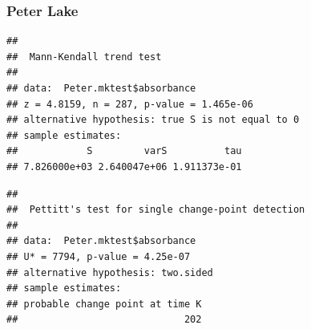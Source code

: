 \documentclass[12pt,]{article}
\newenvironment{Shaded}{\begin{snugshade}}{\end{snugshade}}
\newcommand{\KeywordTok}[1]{\textcolor[rgb]{0.13,0.29,0.53}{\textbf{#1}}}
\newcommand{\DecValTok}[1]{\textcolor[rgb]{0.00,0.00,0.81}{#1}}
\newcommand{\StringTok}[1]{\textcolor[rgb]{0.31,0.60,0.02}{#1}}
\newcommand{\CommentTok}[1]{\textcolor[rgb]{0.56,0.35,0.01}{\textit{#1}}}
\newcommand{\OperatorTok}[1]{\textcolor[rgb]{0.81,0.36,0.00}{\textbf{#1}}}
\newcommand{\NormalTok}[1]{#1}
\begin{document}
\subsubsection{Peter Lake}\label{peter-lake}

\begin{Shaded}
\end{Shaded}

\begin{verbatim}
## 
##  Mann-Kendall trend test
## 
## data:  Peter.mktest$absorbance
## z = 4.8159, n = 287, p-value = 1.465e-06
## alternative hypothesis: true S is not equal to 0
## sample estimates:
##            S         varS          tau 
## 7.826000e+03 2.640047e+06 1.911373e-01
\end{verbatim}

\begin{Shaded}
\end{Shaded}

\begin{verbatim}
## 
##  Pettitt's test for single change-point detection
## 
## data:  Peter.mktest$absorbance
## U* = 7794, p-value = 4.25e-07
## alternative hypothesis: two.sided
## sample estimates:
## probable change point at time K 
##                             202
\end{verbatim}

\begin{Shaded}
\end{Shaded}
\end{document}
